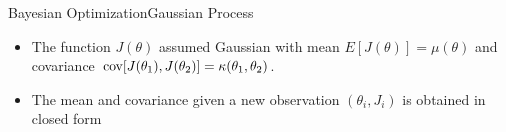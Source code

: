 \documentclass{beamer}
\begin{document}
\begin{frame}{Bayesian Optimization}{Gaussian Process}
\begin{itemize}
\item The function $J(\theta)$ assumed Gaussian with  mean $E[J(\theta)] = \mu(\theta)$ and 
 covariance $\operatorname*{cov}[J(\theta_1), J(\theta_2)] = \kappa(\theta_1, \theta_2)$.
\item The  mean and covariance given a new observation $(\theta_i, J_i)$ is obtained in closed form
\end{itemize}

\end{frame}
\end{document}
